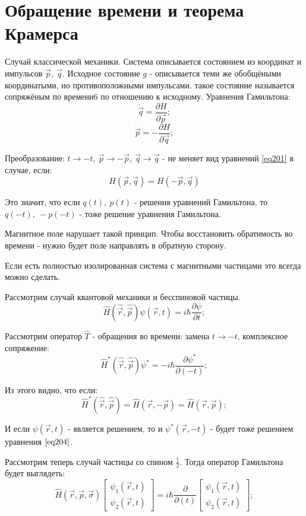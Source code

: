\documentclass[a4paper, 14pt, russian]{article}
\newcommand{\be}{\begin{equation}}
\newcommand{\ee}{\end{equation}}
\newcommand{\pa}{\partial}
\begin{document}
	\section{Обращение времени и теорема Крамерса}

	Случай классической механики. Система описывается состоянием из координат 
	и импульсов $\vec p,~\vec q$. Исходное состояние $g$ - описывается теми же 
	обобщёными координатыми, но противоположными импульсами. такое состояние
	называется сопряжёным по времени6 по отношению к исходному. Уравнения Гамильтона:
	\be
		\label{eq201}
		\dot{\vec q} = \frac{\pa H}{\pa \vec p};
	\ee 
	\be
		\dot{\vec p} = - \frac{\pa H}{\pa \vec q};
	\ee

	Преобразование: $t \rightarrow - t,~ \vec p \rightarrow - \vec p,
	~\vec q \rightarrow \vec q$ - не меняет вид уравнений \ref{eq201}
	в случае, если:
	\be
		\label{eq202}
		H(\vec p, \vec q) = H(-\vec p, \vec q)
	\ee

	Это значит, что если $q(t),~p(t)$ - решения уравнений Гамильтона, то 
	$q(-t),~-p(-t)$ - тоже решение уравнения Гамильтона.

	Магнитное поле нарушает такой принцип. Чтобы восстановить обратимость 
	во времени - нужно будет поле направлять в обратную сторону.

	Если есть полностью изолированная система с магнитными частицами
	это всегда можно сделать.

	Рассмотрим случай квантовой механики и бесспиновой частицы.
	\be
		\label{eq203}
		\hat{H}(\hat{\vec r}, \hat{\vec p}) \psi(\vec r, t) = i \hbar 
			\frac{\pa \psi}{\pa t};
	\ee

	Рассмотрим оператор $\hat T$ - обращения во времени: замена $t \rightarrow - t$,
	комплексное сопряжение:
	\be
		\label{eq204}
		\hat{H}^{*}(\hat{\vec r}, \hat{\vec p}) \psi^{*} = -i\hbar \frac{\pa \psi^{*}}{\pa (-t)};
	\ee

	Из этого видно, что если:
	\be
		\label{eq205}
		\hat{H}^{*}(\hat{\vec r}, \hat{\vec p}) = \hat{H}(\vec r, -\vec p)
		 = \hat{H}(\vec r, \vec p);
	\ee

	И если $\psi(\vec r, t)$ - является решением, то и $\psi^{*} (\vec r, -t)$ - 
	будет тоже решением уравнения $\ref{eq204}$.

	Рассмотрим теперь случай частицы со спином $\frac{1}{2}$. Тогда 
	оператор Гамильтона будет выглядеть:
	\be
		\label{eq206}
		\hat{H}(\vec r, \vec p, \vec \sigma)
		\begin{bmatrix} \psi_1(\vec r, t)\\ \psi_2(\vec r, t)\end{bmatrix}
		 = i \hbar \frac{\pa}{\pa(t)}
		\begin{bmatrix} \psi_1(\vec r, t)\\ \psi_2(\vec r, t)\end{bmatrix};
	\ee
\end{document}
